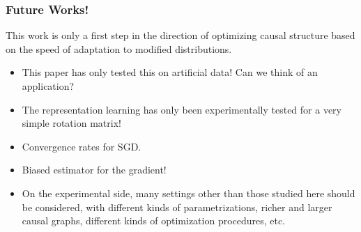 \documentclass{beamer}
\begin{document}
\begin{frame}
\frametitle{Future Works!}
This work is only a first step in the direction of optimizing causal structure based on the speed of
adaptation to modified distributions.
\begin{itemize}
	\item This paper has only tested this on artificial data! Can we think of an application?
	\item 
	The representation learning has only been experimentally tested for a very simple rotation matrix!
	
	\item
	Convergence rates for SGD.
	
	\item Biased estimator for the gradient!
	
	\item 
	On the experimental side, many settings other than those studied here should be considered, with different kinds of parametrizations, richer and larger causal graphs, different kinds of optimization procedures, etc.

\end{itemize}
\end{frame}
\end{document}
